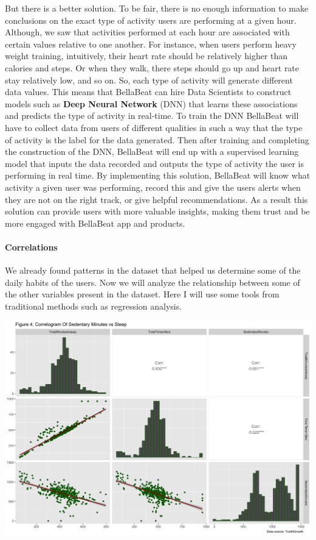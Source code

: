 \documentclass[
]{article}
\begin{document}
But there is a better solution. To be fair, there is no enough
information to make conclusions on the exact type of activity users are
performing at a given hour. Although, we saw that activities performed
at each hour are associated with certain values relative to one another.
For instance, when users perform heavy weight training, intuitively,
their heart rate should be relatively higher than calories and steps. Or
when they walk, there steps should go up and heart rate stay relatively
low, and so on. So, each type of activity will generate different data
values. This means that BellaBeat can hire Data Scientists to construct
models such as \textbf{Deep Neural Network} (DNN) that learns these
associations and predicts the type of activity in real-time. To train
the DNN BellaBeat will have to collect data from users of different
qualities in such a way that the type of activity is the label for the
data generated. Then after training and completing the construction of
the DNN, BellaBeat will end up with a supervised learning model that
inputs the data recorded and outputs the type of activity the user is
performing in real time. By implementing this solution, BellaBeat will
know what activity a given user was performing, record this and give the
users alerts when they are not on the right track, or give helpful
recommendations. As a result this solution can provide users with more
valuable insights, making them trust and be more engaged with BellaBeat
app and products.

\hypertarget{correlations}{%
\paragraph{Correlations}\label{correlations}}

We already found patterns in the dataset that helped us determine some
of the daily habits of the users. Now we will analyze the relationship
between some of the other variables present in the dataset. Here I will
use some tools from traditional methods such as regression analysis.

\includegraphics[width=0.9\linewidth]{./figs/correlogram1}
\end{document}
